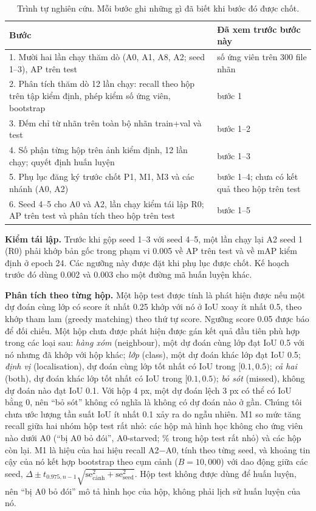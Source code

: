 \documentclass[11pt]{article}
\begin{document}
\begin{table}[t]\centering\caption{Trình tự nghiên cứu. Mỗi bước ghi những gì đã biết khi bước đó được chốt.}\label{tab:sequence}
\footnotesize\begin{tabular}{p{}p{}}\toprule
Bước & Đã xem trước bước này \\\midrule
1. Mười hai lần chạy thăm dò (A0, A1, A8, A2; seed 1--3), AP trên test & số ứng viên trên 300 file nhãn \\
2. Phân tích thăm dò 12 lần chạy: recall theo hộp trên tập kiểm định, phép kiểm số ứng viên, bootstrap & bước 1 \\
3. Đếm chỉ từ nhãn trên toàn bộ nhãn train+val và test & bước 1--2 \\
4. Số phận từng hộp trên ảnh kiểm định, 12 lần chạy; quyết định huấn luyện & bước 1--3 \\
5. Phụ lục đăng ký trước chốt P1, M1, M3 và các nhánh (A0, A2) & bước 1--4; chưa có kết quả theo hộp trên test \\
6. Seed 4--5 cho A0 và A2, lần chạy kiểm tái lập R0; AP trên test và phân tích theo hộp trên test & bước 1--5 \\\bottomrule
\end{tabular}\end{table}

\textbf{Kiểm tái lập.} Trước khi gộp seed 1--3 với seed 4--5, một lần chạy lại A2 seed 1 (R0) phải khớp bản gốc trong phạm vi
0.005 về AP trên test và về mAP kiểm định ở epoch 24. Các ngưỡng này được đặt khi phụ lục được chốt. Kế hoạch trước đó dùng 0.002
và 0.003 cho một đường mã huấn luyện khác.

\textbf{Phân tích theo từng hộp.} Một hộp test được tính là phát hiện được nếu một dự đoán cùng lớp có score ít nhất 0.25 khớp
với nó ở IoU xoay ít nhất 0.5, theo khớp tham lam (greedy matching) theo thứ tự score. Ngưỡng score 0.05 được báo để đối chiếu.
Một hộp chưa được phát hiện được gán kết quả đầu tiên phù hợp trong các loại sau: \emph{hàng xóm} (neighbour), một dự đoán cùng
lớp đạt IoU 0.5 với nó nhưng đã khớp với hộp khác; \emph{lớp} (class), một dự đoán khác lớp đạt IoU 0.5; \emph{định vị}
(localisation), dự đoán cùng lớp tốt nhất có IoU trong $[0.1, 0.5)$; \emph{cả hai} (both), dự đoán khác lớp tốt nhất có IoU trong
$[0.1, 0.5)$; \emph{bỏ sót} (missed), không dự đoán nào đạt IoU 0.1. Với hộp 4 px, một dự đoán lệch 3 px có thể có IoU bằng 0,
nên ``bỏ sót'' không có nghĩa là không có dự đoán nào ở gần. Chúng tôi chưa ước lượng tần suất IoU ít nhất 0.1 xảy ra do ngẫu
nhiên. M1 so mức tăng recall giữa hai nhóm hộp test rất nhỏ: các hộp mà hình học không cho ứng viên nào dưới A0 (``bị A0 bỏ
đói'', A0-starved; \vtZeroCandTest\% trong \nVtTest{} hộp test rất nhỏ) và các hộp còn lại. M1 là hiệu của hai hiệu recall A2$-$A0,
tính theo từng seed, và khoảng tin cậy của nó kết hợp bootstrap theo cụm cảnh ($B=10{,}000$) với dao động giữa các seed,
$\Delta\pm t_{0.975,n-1}\sqrt{\mathrm{se}_\text{cảnh}^2+\mathrm{se}_\text{seed}^2}$. Hộp test không được dùng để huấn luyện, nên
``bị A0 bỏ đói'' mô tả hình học của hộp, không phải lịch sử huấn luyện của nó.
\end{document}
